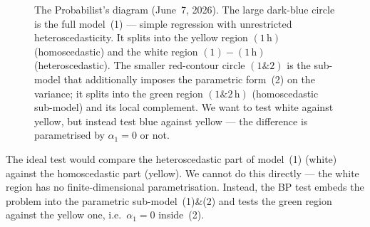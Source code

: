 \documentclass[a4paper,oneside,12pt]{extarticle}
\theoremstyle{plain}
\theoremstyle{definition}
\theoremstyle{remark}
\begin{document}
\begin{figure}[ht]
\centering
{}
\caption{The Probabilist's diagram (June~7, 2026).  The large dark-blue circle
is the full model~(1) — simple regression with unrestricted
heteroscedasticity.  It splits into the yellow region
$(1\,\mathrm{h})$ (homoscedastic) and the white region
$(1)-(1\,\mathrm{h})$ (heteroscedastic).  The smaller red-contour
circle $(1\&2)$ is the sub-model that additionally imposes the
parametric form~(2) on the variance; it splits into the green region
$(1\&2\,\mathrm{h})$ (homoscedastic sub-model) and its local
complement.  We want to test white against yellow, but instead test
blue against yellow — the difference is parametrised by $\alpha_1=0$
or not.}
\label{fig:bp-circles}
\end{figure}

The ideal test would compare the heteroscedastic part of model~(1)
(white) against the homoscedastic part (yellow).  We cannot do this
directly — the white region has no finite-dimensional parametrisation.
Instead, the BP test embeds the problem into the parametric
sub-model~(1)\&(2) and tests the green region against the yellow one,
i.e.\ $\alpha_1 = 0$ inside~(2).
\end{document}
